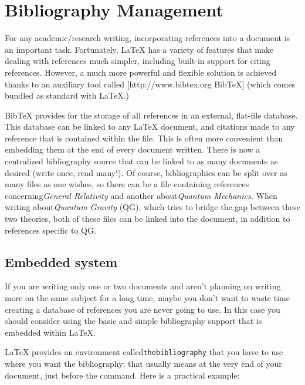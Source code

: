 \section{Bibliography Management}
For any academic/research writing, incorporating references into a document is
an important task. Fortunately, LaTeX has a variety of features that make
dealing with references much simpler, including built-in support for citing
references. However, a much more powerful and flexible solution is achieved
thanks to an auxiliary tool called [http://www.bibtex.org BibTeX] (which comes
bundled as standard with LaTeX.)

BibTeX provides for the storage of all references in an external, flat-file
database. This database can be linked to any LaTeX document, and citations made
to any reference that is contained within the file. This is often more
convenient than embedding them at the end of every document written. There is
now a centralized bibliography source that can be linked to as many documents
as desired (write once, read many!). Of course, bibliographies can be split
over as many files as one wishes, so there can be a file containing references
concerning\textit{General Relativity} and another about\textit{Quantum
Mechanics.} When writing about\textit{Quantum Gravity} (QG), which tries to
bridge the gap between these two theories, both of these files can be linked
into the document, in addition to references specific to QG.

\subsection{Embedded system}
If you are writing only one or two documents and aren't planning on writing
more on the same subject for a long time, maybe you don't want to waste time
creating a database of references you are never going to use. In this case you
should consider using the basic and simple bibliography support that is
embedded within LaTeX.

LaTeX provides an environment called\verb|thebibliography| that you have to use
where you want the bibliography; that usually means at the very end of your
document, just before the\verb|| command. Here is a practical
example:

